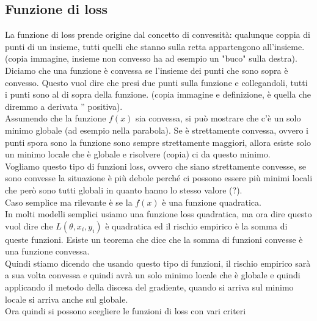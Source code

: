 \documentclass[12pt, oneside]{extbook}
\begin{document}
\subsection{Funzione di loss}
La funzione di loss prende origine dal concetto di convessità: qualunque coppia di punti di un insieme, tutti quelli che stanno sulla retta appartengono all'insieme. (copia immagine, insieme non convesso ha ad esempio un "buco" sulla destra). Diciamo che una funzione è convessa se l'insieme dei punti che sono sopra è convesso. Questo vuol dire che presi due punti sulla funzione e collegandoli, tutti i punti sono al di sopra della funzione. (copia immagine e definizione, è quella che diremmo a derivata '' positiva).\\Assumendo che la funzione $f(x)$ sia convessa, si può mostrare che c'è un solo minimo globale (ad esempio nella parabola). Se è strettamente convessa, ovvero i punti spora sono la funzione sono sempre strettamente maggiori, allora esiste solo un minimo locale che è globale e risolvere (copia) ci da questo minimo.\\Vogliamo questo tipo di funzioni loss, ovvero che siano strettamente convesse, se sono convesse la situazione è più debole perché ci possono essere più minimi locali che però sono tutti globali in quanto hanno lo stesso valore (?).\\Caso semplice ma rilevante è se la $f(x)$ è una funzione quadratica.\\In molti modelli semplici usiamo una funzione loss quadratica, ma ora dire questo vuol dire che $L(\theta, x_i, y_i)$ è quadratica ed il rischio empirico è la somma di queste funzioni. Esiste un teorema che dice che la somma di funzioni convesse è una funzione convessa.\\Quindi stiamo dicendo che usando questo tipo di funzioni, il rischio empirico sarà a sua volta convessa e quindi avrà un solo minimo locale che è globale e quindi applicando il metodo della discesa del gradiente, quando si arriva sul minimo locale si arriva anche sul globale.\\Ora quindi si possono scegliere le funzioni di loss con vari criteri
\end{document}
